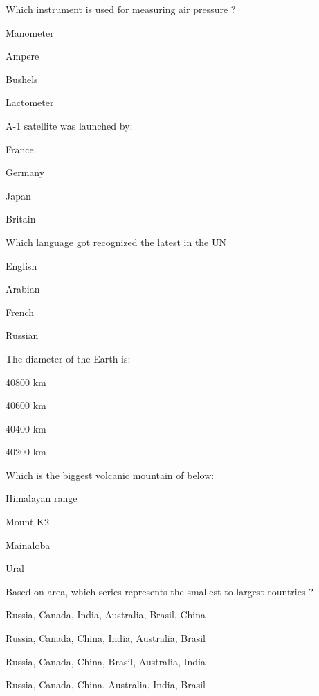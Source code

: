 \begin{questions}
\question Which instrument is used for measuring air pressure ?
  \begin{items}
  \item* Manometer
  \item Ampere
  \item Bushels
  \item Lactometer
  \end{items}

\question A-1 satellite was launched by:
  \begin{items}
  \item* France
  \item Germany
  \item Japan
  \item Britain
  \end{items}

\question Which language got recognized the latest in the UN
  \begin{items}
  \item English
  \item* Arabian
  \item French
  \item Russian
  \end{items}

\question The diameter of the Earth is:
  \begin{items}
  \item 40800 km
  \item 40600 km
  \item 40400 km
  \item 40200 km
  \end{items}

\question Which is the biggest volcanic mountain of below:
  \begin{items}
  \item Himalayan range
  \item Mount K2
  \item Mainaloba
  \item Ural
  \end{items}

\question Based on area, which series represents the smallest to largest countries ?
  \begin{items}
  \item Russia, Canada, India, Australia, Brasil, China
  \item Russia, Canada, China, India, Australia, Brasil
  \item Russia, Canada, China, Brasil, Australia, India
  \item Russia, Canada, China, Australia, India, Brasil
  \end{items}


\end{questions}
